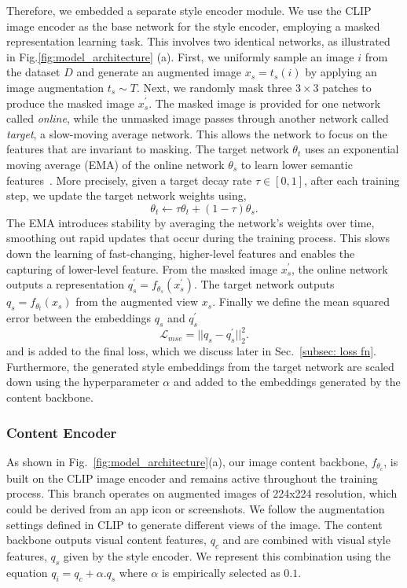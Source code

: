 Therefore, we embedded a separate style encoder module. We use the CLIP image encoder as the base network for the style encoder, employing a masked representation learning task. This involves two identical networks, as illustrated in Fig.\ref{fig:model_architecture} (a). 
First, we uniformly sample an image $i$ from the dataset $D$ and generate an augmented image $x_s = t_s(i)$ by applying an image augmentation $t_s \sim T$. Next, we randomly mask three $3\times3$ patches to produce the masked image $x_s^{'}$.
The masked image is provided for one network called \emph{online}, while the unmasked image passes through another network called \emph{target}, a slow-moving average network. This allows the network to focus on the features that are invariant to masking. The target network $\theta_t$ uses an exponential moving average (EMA) of the online network $\theta_s$ to learn lower semantic features~\cite{assran2022masked, he2022masked}. More precisely, given a target decay rate $\tau \in [0, 1]$, after each training step, we update the target network weights using,
\begin{equation}
\label{eq:ema}
 \theta_t \leftarrow \tau \theta_t + (1 - \tau) \theta_s.
\end{equation}
The EMA introduces stability by averaging the network’s weights over time, smoothing out rapid updates that occur during the training process. This slows down the learning of fast-changing, higher-level features and enables the capturing of lower-level feature. From the masked image $x_s^{'}$, the online network outputs a representation $q_s^{'} = f_{\theta_s}(x_s^{'})$. The target network outputs $q_s = f_{\theta_t}(x_s)$ from the augmented view $x_s$. Finally we define the mean squared error between the embeddings $q_s$ and $q_s^{'}$ 
\begin{equation}
\label{eq:l2}
 \mathcal{L}_{mse} = ||q_s - q_s^{'}||_2^2.
\end{equation} 
and is added to the final loss, which we discuss later in Sec.~\ref{subsec: loss fn}. Furthermore, the generated style embeddings from the target network are scaled down using the hyperparameter $\alpha$ and added to the embeddings generated by the content backbone. 

\subsubsection{Content Encoder}
As shown in Fig.~\ref{fig:model_architecture}(a), our image content backbone, $f_{\theta_c}$, is built on the CLIP image encoder and remains active throughout the training process. This branch operates on augmented images of 224x224 resolution, which could be derived from an app icon or screenshots. We follow the augmentation settings defined in CLIP to generate different views of the image. The content backbone outputs visual content features, $q_c$ and are combined with visual style features, $q_s$ given by the style encoder. We represent this combination using the equation $q_i=q_c+\alpha. q_s$ where $\alpha$ is empirically selected as $0.1$. 

